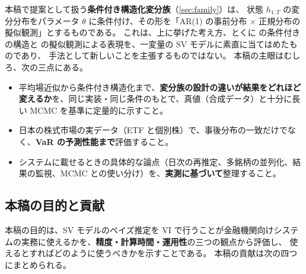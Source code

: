本稿で提案として扱う\textbf{条件付き構造化変分族}（\cref{sec:family}）は、
状態 $h_{1:T}$ の変分分布をパラメータ $\theta$ に条件付け、その形を「AR(1) の事前分布 × 正規分布の擬似観測」とするものである。
これは、上に挙げた考え方、とくに \textcite{tan2020} の条件付きの構造と \textcite{johnson2016} の擬似観測による表現を、一変量の SV モデルに素直に当てはめたものであり、
手法として新しいことを主張するものではない。
本稿の主眼はむしろ、次の三点にある。

\begin{itemize}
  \item 平均場近似から条件付き構造化まで、\textbf{変分族の設計の違いが結果をどれほど変えるか}を、同じ実装・同じ条件のもとで、真値（合成データ）と十分に長い MCMC を基準に定量的に示すこと。
  \item 日本の株式市場の実データ（ETF と個別株）で、事後分布の一致だけでなく、\textbf{VaR の予測性能まで}評価すること。
  \item システムに載せるときの具体的な論点（日次の再推定、多銘柄の並列化、結果の監視、MCMC との使い分け）を、\textbf{実測に基づいて}整理すること。
\end{itemize}

\subsection{本稿の目的と貢献}\label{sec:intro-contrib}

本稿の目的は、SV モデルのベイズ推定を VI で行うことが金融機関向けシステムの実務に使えるかを、\textbf{精度・計算時間・運用性}の三つの観点から評価し、
使えるとすればどのように使うべきかを示すことである。
本稿の貢献は次の四つにまとめられる。

